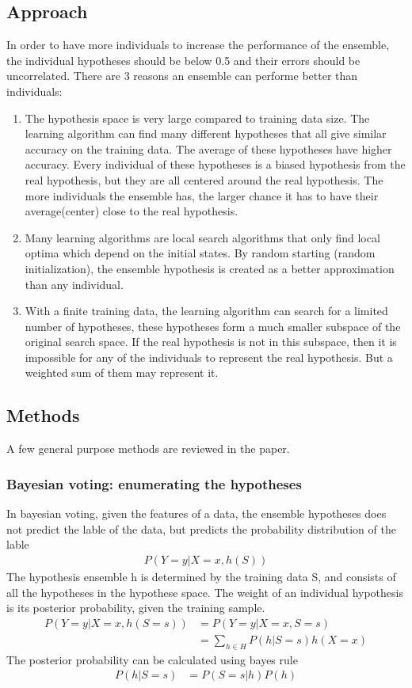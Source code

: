 \documentclass[12pt]{article}
\begin{document}
\subsection{Approach}
In order to have more individuals to increase the performance of the ensemble, the individual hypotheses should be below 0.5 and their errors should be uncorrelated. There are 3 reasons an ensemble can performe better than individuals:
\begin{enumerate}
  \item The hypothesis space is very large compared to training data size. The learning algorithm can find many different hypotheses that all give similar accuracy on the training data. The average of these hypotheses have higher accuracy. Every individual of these hypotheses is a biased hypothesis from the real hypothesis, but they are all centered around the real hypothesis. The more individuals the ensemble has, the larger chance it has to have their average(center) close to the real hypothesis.
  \item Many learning algorithms are local search algorithms that only find local optima which depend on the initial states. By random starting (random initialization), the ensemble hypothesis is created as a better approximation than any individual.
  \item With a finite training data, the learning algorithm can search for a limited number of hypotheses, these hypotheses form a much smaller subspace of the original search space. If the real hypothesis is not in this subspace, then it is impossible for any of the individuals to represent the real hypothesis. But a weighted sum of them may represent it.
\end{enumerate}
\subsection{Methods}
A few general purpose methods are reviewed in the paper.
\subsubsection{Bayesian voting: enumerating the hypotheses}
In bayesian voting, given the features of a data, the ensemble hypotheses does not predict the lable of the data, but predicts the probability distribution of the lable
\begin{align*}
  P(Y=y|X=x,h(S))
\end{align*}
The hypothesis ensemble h is determined by the training data S, and consists of all the hypotheses in the hypothese space. The weight of an individual hypothesis is its posterior probability, given the training sample.
\begin{align*}
  P(Y=y|X=x,h(S=s))
  &= P(Y=y|X=x,S=s)\\
  &= \sum_{h \in H} P(h|S=s) h(X=x)
\end{align*}
The posterior probability can be calculated using bayes rule
\begin{align*}
  P(h|S=s)
  &= P(S=s|h)P(h)
\end{align*}
\end{document}

